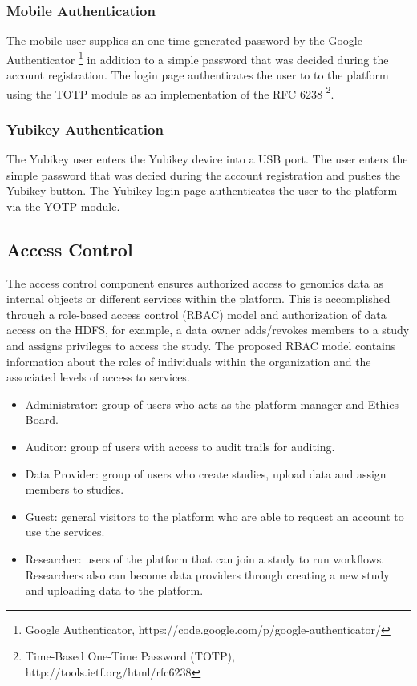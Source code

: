 \subsubsection {Mobile Authentication}
The mobile user supplies an one-time generated password by the Google Authenticator \footnote{Google Authenticator, https://code.google.com/p/google-authenticator/} in addition to a simple password that was decided during the account registration. The login page authenticates the user to to the platform using the TOTP module as an implementation of the RFC 6238 \footnote{Time-Based One-Time Password (TOTP), http://tools.ietf.org/html/rfc6238}.   

\subsubsection {Yubikey Authentication}
The Yubikey user enters the Yubikey device into a USB port. The user enters the simple password that was decied during the account registration and pushes the Yubikey button. The Yubikey login page authenticates the user to the platform via the YOTP module.

\subsection {Access Control}
The access control component ensures authorized access to genomics data as internal objects or different services within the platform. This is accomplished through a role-based access control (RBAC) model and authorization of data access on the HDFS, for example, a data owner adds/revokes members to a study and assigns privileges to access the study.
% 
The proposed RBAC model contains information about the roles of individuals within the organization and the associated levels of access to services.
\begin{itemize}
\item Administrator: group of users who acts as the platform manager and Ethics Board.
\item Auditor: group of users with access to audit trails for auditing.
\item Data Provider: group of users who create studies, upload data and assign members to studies.
\item Guest: general visitors to the platform who are able to request an account to use the services.
\item Researcher: users of the platform that can join a study to run workflows. Researchers also can become data providers through creating a new study and uploading data to the platform.
\end{itemize}

